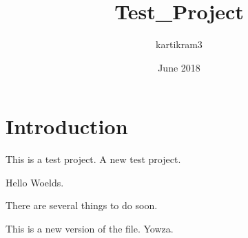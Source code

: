 \documentclass{article}
\title{Test_Project}
\author{kartikram3 }
\date{June 2018}
\begin{document}
\maketitle

\section{Introduction}
This is a test project.
A new test project.

Hello Woelds.

There are several things to do soon.


This is a new version of the file.
Yowza.
\end{document}
